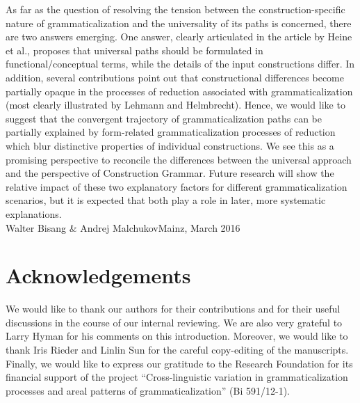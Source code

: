 \documentclass[output=paper]{LSP/langsci}
\begin{document}
As far as the question of resolving the tension between the construction-spe\-ci\-fic nature of grammaticalization and the universality of its paths is concerned, there are two answers emerging. One answer, clearly articulated in the article by Heine et al., proposes that universal paths should be formulated in functional\slash conceptual terms, while the details of the input constructions differ. In addition, several contributions point out that constructional differences become partially opaque in the processes of reduction associated with grammaticalization (most clearly illustrated by Lehmann and Helmbrecht). Hence, we would like to suggest that the convergent trajectory of grammaticalization paths can be partially explained by form-related grammaticalization processes of reduction which blur distinctive properties of individual constructions. We see this as a promising perspective to reconcile the differences between the universal approach and the perspective of Construction Grammar. Future research will show the relative impact of these two explanatory factors for different grammaticalization scenarios, but it is expected that both play a role in later, more systematic explanations.\\

\noindent Walter Bisang \& Andrej Malchukov\hfill Mainz, March 2016

\section*{Acknowledgements}

We would like to thank our authors for their contributions and for their useful discussions in the course of our internal reviewing. We are also very grateful to Larry Hyman for his comments on this introduction. Moreover, we would like to thank Iris Rieder and Linlin Sun for the careful copy-editing of the manuscripts. Finally, we would like to express our gratitude to the  Research Foundation for its financial support of the project “Cross-linguistic variation in grammaticalization processes and areal patterns of grammaticalization” (Bi 591/12-1).


{\sloppy
\printbibliography[heading=subbibliography,notkeyword=this]
}
\end{document}
